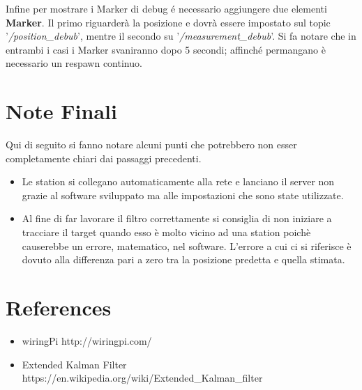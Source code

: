 \documentclass{article}
\begin{document}
Infine per mostrare i Marker di debug \'e necessario aggiungere due elementi \textbf{Marker}.
Il primo riguarder\`a la posizione e dovr\`a essere impostato sul topic '\textit{/position\_debub}', mentre il secondo su '\textit{/measurement\_debub}'.
Si fa notare che in entrambi i casi i Marker svaniranno dopo 5 secondi; affinch\'e permangano \`e necessario un respawn continuo.

\section{Note Finali}
Qui di seguito si fanno notare alcuni punti che potrebbero non esser completamente chiari dai passaggi precedenti.

\begin{itemize}
	\item Le station si collegano automaticamente alla rete e lanciano il server non grazie al software sviluppato ma alle impostazioni che sono state utilizzate.
	\item Al fine di far lavorare il filtro correttamente si consiglia di non iniziare a tracciare il target quando esso è molto vicino ad una station poichè causerebbe un errore, matematico, nel software.  L'errore a cui ci si riferisce è dovuto alla differenza pari a zero tra la posizione predetta e quella stimata.
\end{itemize}

\newpage

\section{References}
\begin{itemize}
	\item wiringPi http://wiringpi.com/
	\item Extended Kalman Filter https://en.wikipedia.org/wiki/Extended\_Kalman\_filter
\end{itemize}

\printindex
\end{document}
